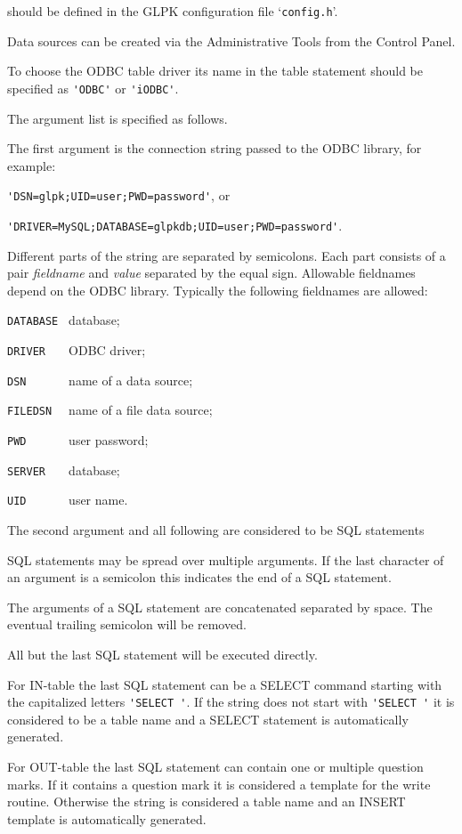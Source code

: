 \documentclass[10pt]{article}
\begin{document}
\noindent
should be defined in the GLPK configuration file `\verb|config.h|'.

Data sources can be created via the Administrative Tools from the
Control Panel.

\bigskip

To choose the ODBC table driver its name in the table statement should
be specified as \verb|'ODBC'| or \verb|'iODBC'|.

The argument list is specified as follows.

The first argument is the connection string passed to the ODBC library,
for example:

\verb|'DSN=glpk;UID=user;PWD=password'|, or

\verb|'DRIVER=MySQL;DATABASE=glpkdb;UID=user;PWD=password'|.

Different parts of the string are separated by semicolons. Each part
consists of a pair {\it fieldname} and {\it value} separated by the
equal sign. Allowable fieldnames depend on the ODBC library. Typically
the following fieldnames are allowed:

\verb|DATABASE | database;

\verb|DRIVER   | ODBC driver;

\verb|DSN      | name of a data source;

\verb|FILEDSN  | name of a file data source;

\verb|PWD      | user password;

\verb|SERVER   | database;

\verb|UID      | user name.

The second argument and all following are considered to be SQL
statements

SQL statements may be spread over multiple arguments.  If the last
character of an argument is a semicolon this indicates the end of
a SQL statement.

The arguments of a SQL statement are concatenated separated by space.
The eventual trailing semicolon will be removed.

All but the last SQL statement will be executed directly.

For IN-table the last SQL statement can be a SELECT command starting
with the capitalized letters \verb|'SELECT '|. If the string does not
start with \verb|'SELECT '| it is considered to be a table name and a
SELECT statement is automatically generated.

For OUT-table the last SQL statement can contain one or multiple
question marks. If it contains a question mark it is considered a
template for the write routine. Otherwise the string is considered a
table name and an INSERT template is automatically generated.
\end{document}
